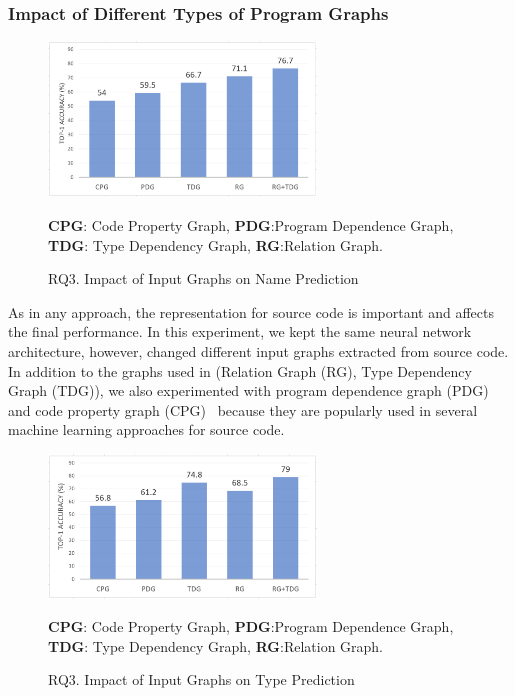 \subsubsection{Impact of Different Types of Program Graphs}
\label{sec:graphs}

\begin{figure}[t]%
\begin{center}
\includegraphics[width=2.8in]{figures/sensi-graphs-name}
\vspace{-8pt}
\caption{RQ3. Impact of Input Graphs on Name Prediction}
\label{graph-name-result}
{\bf CPG}: Code Property Graph, {\bf PDG}:Program Dependence Graph, {\bf TDG}: Type Dependency Graph, {\bf RG}:Relation Graph. 
\end{center}
\end{figure}



As in any approach, the representation for source code is important
and affects the final performance. In this experiment, we kept the
same neural network architecture, however, changed different input
graphs extracted from source code. In addition to the graphs used in
{\tool} (Relation Graph (RG), Type Dependency Graph (TDG)), we also
experimented with program dependence graph (PDG) and code property
graph (CPG)~\cite{CPG-2014} because they are popularly used in several
machine learning approaches for source code.

\begin{figure}[t]%
\begin{center}
\includegraphics[width=2.8in]{figures/sensi-graphs-type}
\vspace{-8pt}
\caption{RQ3. Impact of Input Graphs on Type Prediction}
\label{graph-type-result}
{\bf CPG}: Code Property Graph, {\bf PDG}:Program Dependence Graph, {\bf TDG}: Type Dependency Graph, {\bf RG}:Relation Graph.
\end{center}
\end{figure}

